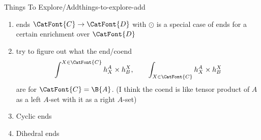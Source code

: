 \begin{remark}{Things To Explore/Add}{things-to-explore-add}
\begin{enumerate}
            \[
                \begin{aligned}
                    \int_{A\in\CatFont{C}}h_{A}\odot\SheafFont{F}^{A},\\
                    \int_{A\in\CatFont{C}}h^{A}\odot F_{A},
                \end{aligned}
                \qquad
                \begin{aligned}
                    \int^{A\in\CatFont{C}}\Sets(h_{A},\SheafFont{F}^{A}),\\
                    \int^{A\in\CatFont{C}}\Sets(h^{A},F_{A})
                \end{aligned}
            \]%
            and the co/ends
            \[
                \begin{aligned}
                    \int^{A\in\CatFont{C}}\SheafFont{F}^{A}\odot h_{A},\\
                    \int^{A\in\CatFont{C}}F_{A}\odot h^{A},\\
                    \int_{A\in\CatFont{C}}\SheafFont{F}^{A}\odot h_{A},\\
                    \int_{A\in\CatFont{C}}F_{A}\odot h^{A},\\
                \end{aligned}
                \qquad
                \begin{aligned}
                    \int_{A\in\CatFont{C}}\Sets(\SheafFont{F}^{A},h_{A}),\\
                    \int_{A\in\CatFont{C}}\Sets(F_{A},h^{A}),\\
                    \int^{A\in\CatFont{C}}\Sets(\SheafFont{F}^{A},h_{A}),\\
                    \int^{A\in\CatFont{C}}\Sets(F_{A},h^{A})
                \end{aligned}
            \]%
            are.
        \item ends $\CatFont{C}\to\CatFont{D}$ with $\odot$ is a special case of ends for a certain enrichment over $\CatFont{D}$
        \item try to figure out what the end/coend
            \[
                \int^{X\in\CatFont{C}}h^{A}_{X}\times h^{X}_{B},%
                \qquad%
                \int_{X\in\CatFont{C}}h^{A}_{X}\times h^{X}_{B}%
            \]%
            are for $\CatFont{C}=\B{A}$. (I think the coend is like tensor product of $A$ as a left $A$-set with it as a right $A$-set)
        \item Cyclic ends
        \item Dihedral ends

\end{enumerate}
\end{remark}
